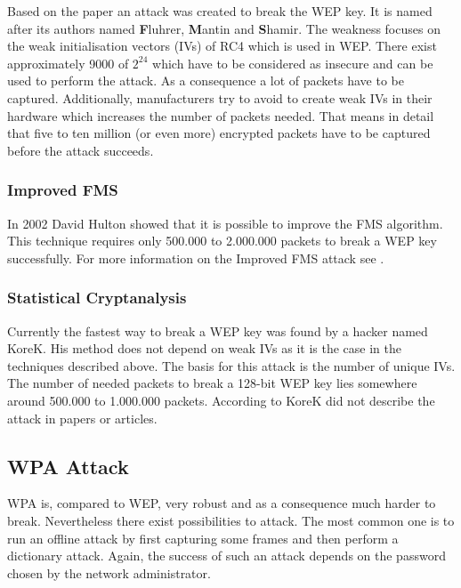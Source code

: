 Based on the paper \cite{rc4weak} an attack was created to break the WEP key. It is named after its authors named {\bf F}luhrer, {\bf M}antin and {\bf S}hamir. The weakness focuses on the weak initialisation vectors (IVs) of RC4 which is used in WEP. There exist approximately 9000 of $2^{24}$ which have to be considered as insecure and can be used to perform the attack. As a consequence a lot of packets have to be captured. Additionally, manufacturers try to avoid to create weak IVs in their hardware which increases the number of packets needed. That means in detail that five to ten million (or even more) encrypted packets have to be captured before the attack succeeds. \cite[p.61f]{wlan_sicherheit}

\subsubsection{Improved FMS}

In 2002 David Hulton showed that it is possible to improve the FMS algorithm. This technique requires only 500.000 to 2.000.000 packets to break a WEP key successfully. For more information on the Improved FMS attack see \cite{improved_fms}.

\subsubsection{Statistical Cryptanalysis}

Currently the fastest way to break a WEP key was found by a hacker named KoreK. His method does not depend on weak IVs as it is the case in the techniques described above. The basis for this attack is the number of unique IVs. The number of needed packets to break a 128-bit WEP key lies somewhere around 500.000 to 1.000.000 packets. According to \cite[p.62]{wlan_sicherheit} KoreK did not describe the attack in papers or articles.

\subsection*{WPA Attack}

WPA is, compared to WEP, very robust \cite[p.129]{wlan_sicherheit} and as a consequence much harder to break. Nevertheless there exist possibilities to attack. The most common one is to run an offline attack by first capturing some frames and then perform a dictionary attack. Again, the success of such an attack depends on the password chosen by the network administrator.

